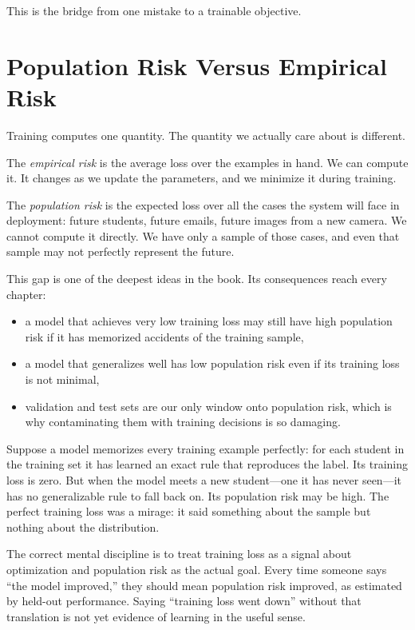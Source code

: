 This is the bridge from one mistake to a trainable objective.

\section*{Population Risk Versus Empirical Risk}

Training computes one quantity. The quantity we actually care about is different.

The \emph{empirical risk} is the average loss over the examples in hand. We can compute it. It changes as we update the parameters, and we minimize it during training.

The \emph{population risk} is the expected loss over all the cases the system will face in deployment: future students, future emails, future images from a new camera. We cannot compute it directly. We have only a sample of those cases, and even that sample may not perfectly represent the future.

This gap is one of the deepest ideas in the book. Its consequences reach every chapter:
\begin{itemize}[leftmargin=*]
\item a model that achieves very low training loss may still have high population risk if it has memorized accidents of the training sample,
\item a model that generalizes well has low population risk even if its training loss is not minimal,
\item validation and test sets are our only window onto population risk, which is why contaminating them with training decisions is so damaging.
\end{itemize}

\begin{example}
Suppose a model memorizes every training example perfectly: for each student in the training set it has learned an exact rule that reproduces the label. Its training loss is zero. But when the model meets a new student---one it has never seen---it has no generalizable rule to fall back on. Its population risk may be high. The perfect training loss was a mirage: it said something about the sample but nothing about the distribution.
\end{example}

The correct mental discipline is to treat training loss as a signal about optimization and population risk as the actual goal. Every time someone says ``the model improved,'' they should mean population risk improved, as estimated by held-out performance. Saying ``training loss went down'' without that translation is not yet evidence of learning in the useful sense.

